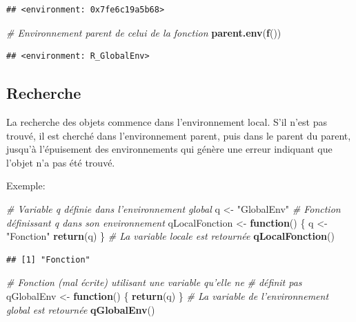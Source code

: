 \documentclass[
  12pt,
  french,
  a4paper,
  extrafontsizes,onecolumn,openright
  ]{memoir}
\newenvironment{Shaded}{\begin{snugshade}}{\end{snugshade}}
\newcommand{\CommentTok}[1]{\textcolor[rgb]{0.56,0.35,0.01}{\textit{#1}}}
\newcommand{\ControlFlowTok}[1]{\textcolor[rgb]{0.13,0.29,0.53}{\textbf{#1}}}
\newcommand{\KeywordTok}[1]{\textcolor[rgb]{0.13,0.29,0.53}{\textbf{#1}}}
\newcommand{\NormalTok}[1]{#1}
\newcommand{\StringTok}[1]{\textcolor[rgb]{0.31,0.60,0.02}{#1}}
\begin{document}
\begin{verbatim}
## <environment: 0x7fe6c19a5b68>
\end{verbatim}

\begin{Shaded}
\begin{Highlighting}[]
\CommentTok{# Environnement parent de celui de la fonction}
\KeywordTok{parent.env}\NormalTok{(}\KeywordTok{f}\NormalTok{())}
\end{Highlighting}
\end{Shaded}

\begin{verbatim}
## <environment: R_GlobalEnv>
\end{verbatim}

\normalsize

\hypertarget{recherche}{%
\subsection{Recherche}\label{recherche}}

La recherche des objets commence dans l'environnement local.
S'il n'est pas trouvé, il est cherché dans l'environnement parent, puis dans le parent du parent, jusqu'à l'épuisement des environnements qui génère une erreur indiquant que l'objet n'a pas été trouvé.

Exemple:

\scriptsize

\begin{Shaded}
\begin{Highlighting}[]
\CommentTok{# Variable q définie dans l'environnement global}
\NormalTok{q <-}\StringTok{ "GlobalEnv"}
\CommentTok{# Fonction définissant q dans son environnement}
\NormalTok{qLocalFonction <-}\StringTok{ }\ControlFlowTok{function}\NormalTok{() \{}
\NormalTok{    q <-}\StringTok{ "Fonction"}
    \KeywordTok{return}\NormalTok{(q)}
\NormalTok{\}}
\CommentTok{# La variable locale est retournée}
\KeywordTok{qLocalFonction}\NormalTok{()}
\end{Highlighting}
\end{Shaded}

\begin{verbatim}
## [1] "Fonction"
\end{verbatim}

\begin{Shaded}
\begin{Highlighting}[]
\CommentTok{# Fonction (mal écrite) utilisant une variable qu'elle ne}
\CommentTok{# définit pas}
\NormalTok{qGlobalEnv <-}\StringTok{ }\ControlFlowTok{function}\NormalTok{() \{}
    \KeywordTok{return}\NormalTok{(q)}
\NormalTok{\}}
\CommentTok{# La variable de l'environnement global est retournée}
\KeywordTok{qGlobalEnv}\NormalTok{()}
\end{Highlighting}
\end{Shaded}
\end{document}
